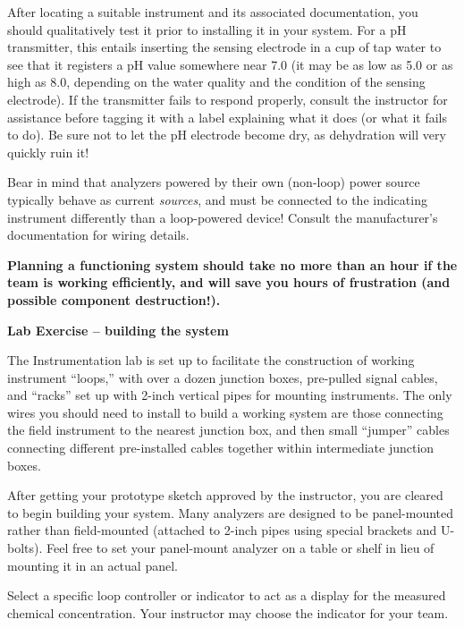 After locating a suitable instrument and its associated documentation, you should qualitatively test it prior to installing it in your system.  For a pH transmitter, this entails inserting the sensing electrode in a cup of tap water to see that it registers a pH value somewhere near 7.0 (it may be as low as 5.0 or as high as 8.0, depending on the water quality and the condition of the sensing electrode).  If the transmitter fails to respond properly, consult the instructor for assistance before tagging it with a label explaining what it does (or what it fails to do).  Be sure not to let the pH electrode become dry, as dehydration will very quickly ruin it!

Bear in mind that analyzers powered by their own (non-loop) power source typically behave as current {\it sources}, and must be connected to the indicating instrument differently than a loop-powered device!  Consult the manufacturer's documentation for wiring details.

\vskip 10pt

{\bf Planning a functioning system should take no more than an hour if the team is working efficiently, and will save you hours of frustration (and possible component destruction!).}





\vfil \eject

\noindent
{\bf Lab Exercise -- building the system}

\vskip 5pt

The Instrumentation lab is set up to facilitate the construction of working instrument ``loops,'' with over a dozen junction boxes, pre-pulled signal cables, and ``racks'' set up with 2-inch vertical pipes for mounting instruments.  The only wires you should need to install to build a working system are those connecting the field instrument to the nearest junction box, and then small ``jumper'' cables connecting different pre-installed cables together within intermediate junction boxes.

After getting your prototype sketch approved by the instructor, you are cleared to begin building your system.  Many analyzers are designed to be panel-mounted rather than field-mounted (attached to 2-inch pipes using special brackets and U-bolts).  Feel free to set your panel-mount analyzer on a table or shelf in lieu of mounting it in an actual panel.  

Select a specific loop controller or indicator to act as a display for the measured chemical concentration.  Your instructor may choose the indicator for your team.  

